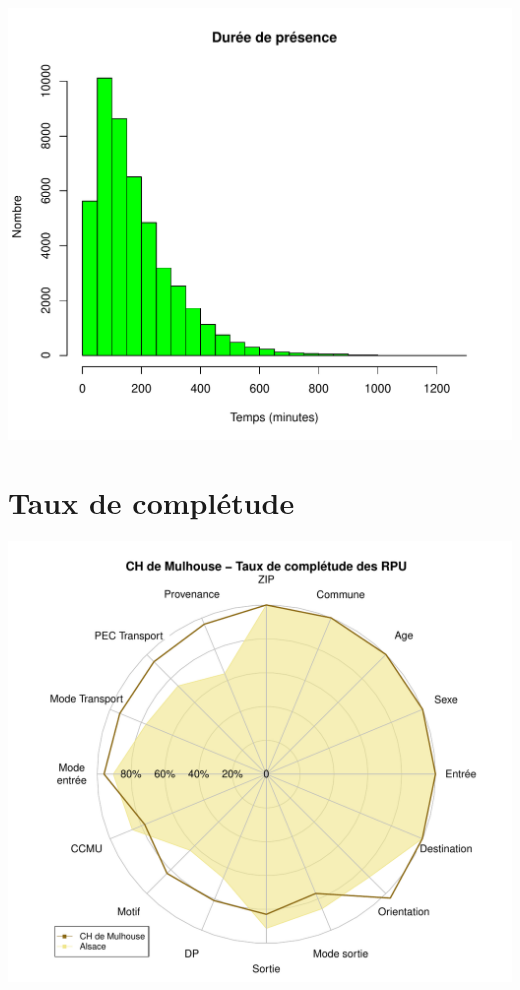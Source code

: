 \documentclass[12pt,english,french,twoside]{book}\usepackage[]{graphicx}\usepackage[]{color}
\makeatletter
\def\maxwidth{ %
  \ifdim\Gin@nat@width>\linewidth
    \linewidth
  \else
    \Gin@nat@width
  \fi
}
\newenvironment{knitrout}{}{} %
\makeatother
\begin{document}
\begin{knitrout}
\color{fgcolor}
\includegraphics[width=\maxwidth]{figure/graphe_p_mul-1} 

\end{knitrout}


\section*{Taux de complétude}

\begin{knitrout}
\color{fgcolor}
\includegraphics[width=\maxwidth]{figure/compl_mul-1} 

\end{knitrout}
\end{document}
